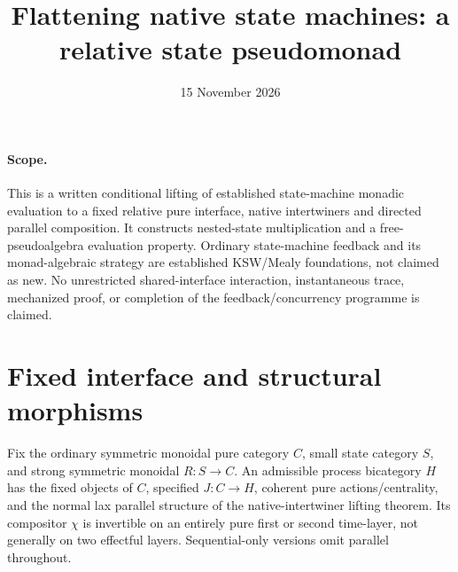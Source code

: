 \documentclass{article}
\title{Flattening native state machines: a relative state pseudomonad}
\date{15 November 2026}
\begin{document}
\maketitle
\paragraph{Scope.} This is a written conditional lifting of established state-machine monadic evaluation to a fixed relative pure interface, native intertwiners and directed parallel composition. It constructs nested-state multiplication and a free-pseudoalgebra evaluation property. Ordinary state-machine feedback and its monad-algebraic strategy are established KSW/Mealy foundations, not claimed as new. No unrestricted shared-interface interaction, instantaneous trace, mechanized proof, or completion of the feedback/concurrency programme is claimed.

\section{Fixed interface and structural morphisms}
Fix the ordinary symmetric monoidal pure category $C$, small state category $S$, and strong symmetric monoidal $R:S\to C$. An admissible process bicategory $H$ has the fixed objects of $C$, specified $J:C\to H$, coherent pure actions/centrality, and the normal lax parallel structure of the native-intertwiner lifting theorem. Its compositor $\chi$ is invertible on an entirely pure first or second time-layer, not generally on two effectful layers. Sequential-only versions omit parallel throughout.
\end{document}
